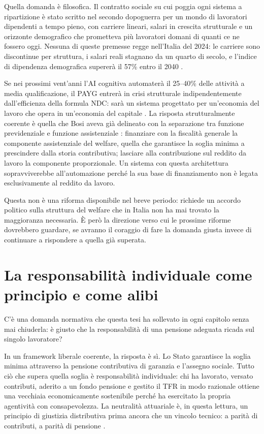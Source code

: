 Quella domanda è filosofica.
Il contratto sociale su cui poggia ogni sistema a ripartizione è stato
scritto nel secondo dopoguerra per un mondo di lavoratori dipendenti a
tempo pieno, con carriere lineari, salari in crescita strutturale e un
orizzonte demografico che prometteva più lavoratori domani di quanti
ce ne fossero oggi.
Nessuna di queste premesse regge nell'Italia del 2024: le carriere sono
discontinue per struttura, i salari reali stagnano da un quarto di secolo,
e l'indice di dipendenza demografica supererà il 57\% entro il 2040
\cite{MEFRGS2025, Fornero2018}.

Se nei prossimi vent'anni l'AI cognitiva automaterà il 25--40\% delle
attività a media qualificazione, il PAYG entrerà in crisi strutturale
indipendentemente dall'efficienza della formula NDC: sarà un sistema
progettato per un'economia del lavoro che opera in un'economia del capitale
\cite{AcemogluJohnson2023}.
La risposta strutturalmente coerente è quella che Bosi aveva già
delineato con la separazione tra funzione previdenziale e funzione
assistenziale \cite{Bosi2018}: finanziare con la fiscalità generale la
componente assistenziale del welfare, quella che garantisce la soglia
minima a prescindere dalla storia contributiva; lasciare alla
contribuzione sul reddito da lavoro la componente proporzionale.
Un sistema con questa architettura sopravviverebbe all'automazione
perché la sua base di finanziamento non è legata esclusivamente al
reddito da lavoro.

Questa non è una riforma disponibile nel breve periodo: richiede un
accordo politico sulla struttura del welfare che in Italia non ha mai
trovato la maggioranza necessaria.
È però la direzione verso cui le prossime riforme dovrebbero guardare,
se avranno il coraggio di fare la domanda giusta invece di continuare
a rispondere a quella già superata.


\section*{La responsabilità individuale come principio e come alibi}

\noindent
C'è una domanda normativa che questa tesi ha sollevato in ogni capitolo
senza mai chiuderla: è giusto che la responsabilità di una pensione
adeguata ricada sul singolo lavoratore?

In un framework liberale coerente, la risposta è sì.
Lo Stato garantisce la soglia minima attraverso la pensione contributiva
di garanzia e l'assegno sociale.
Tutto ciò che supera quella soglia è responsabilità individuale: chi ha
lavorato, versato contributi, aderito a un fondo pensione e gestito
il TFR in modo razionale ottiene una vecchiaia economicamente sostenibile
perché ha esercitato la propria agentività con consapevolezza.
La neutralità attuariale è, in questa lettura, un principio di giustizia
distributiva prima ancora che un vincolo tecnico: a parità di contributi,
a parità di pensione \cite{Bosi2018}.

